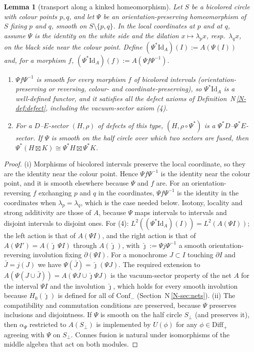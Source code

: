 \documentclass[11pt]{article}
\newtheorem{lemma}[theorem]{Lemma}
\theoremstyle{definition}
\theoremstyle{remark}
\newcommand{\fus}{\boxtimes}
\newcommand{\Id}{\mathrm{Id}}
\newcommand{\nref}[1]{N\,\ref{N-#1}}
\begin{document}
\begin{lemma}[transport along a kinked homeomorphism]\label{lem:transport}
Let $S$ be a bicolored circle with colour points $p,q$, and let $\Psi$ be an orientation-preserving homeomorphism of $S$ fixing $p$ and $q$, smooth on $S\setminus\{p,q\}$. In the local coordinates at $p$ and at $q$, assume $\Psi$ is the identity on the white side and the dilation $x\mapsto\lambda_px$, resp.\ $\lambda_qx$, on the black side near the colour point. Define $(\Psi^*\Id_A)(I):=A(\Psi(I))$ and, for a morphism $f$, $(\Psi^*\Id_A)(f):=A(\Psi f\Psi^{-1})$.
\begin{enumerate}[nosep,label=(\roman*)]
\item $\Psi f\Psi^{-1}$ is smooth for every morphism $f$ of bicolored intervals (orientation-preserving or reversing, colour- and coordinate-preserving), so $\Psi^*\Id_A$ is a well-defined functor, and it satisfies all the defect axioms of Definition~\nref{def:defect}, including the vacuum-sector axiom (4).
\item For a $D$--$E$-sector $(H,\rho)$ of defects of this type, $(H,\rho\circ\Psi^*)$ is a $\Psi^*D$--$\Psi^*E$-sector. If $\Psi$ is smooth on the half circle over which two sectors are fused, then $\Psi^*(H\fus K)\cong\Psi^*H\fus\Psi^*K$.
\end{enumerate}
\end{lemma}
\begin{proof}
(i) Morphisms of bicolored intervals preserve the local coordinate, so they are the identity near the colour point. Hence $\Psi f\Psi^{-1}$ is the identity near the colour point, and it is smooth elsewhere because $\Psi$ and $f$ are. For an orientation-reversing $f$ exchanging $p$ and $q$ in the coordinates, $\Psi f\Psi^{-1}$ is the identity in the coordinates when $\lambda_p=\lambda_q$, which is the case needed below. Isotony, locality and strong additivity are those of $A$, because $\Psi$ maps intervals to intervals and disjoint intervals to disjoint ones. For (4): $L^2((\Psi^*\Id_A)(I))=L^2(A(\Psi I))$; the left action is that of $A(\Psi I)$, and the right action is that of $A(\Psi I')=A(\hat\jmath\,\Psi I)$ through $A(\hat\jmath)$, with $\hat\jmath:=\Psi j\Psi^{-1}$ a smooth orientation-reversing involution fixing $\partial(\Psi I)$. For a monochrome $J\subset I$ touching $\partial I$ and $\bar J=j(J)$ we have $\Psi(\bar J)=\hat\jmath(\Psi J)$. The required extension to $A(\Psi(J\cup\bar J))=A(\Psi J\cup\hat\jmath\Psi J)$ is the vacuum-sector property of the net $A$ for the interval $\Psi I$ and the involution $\hat\jmath$, which holds for every smooth involution because $H_0(\hat\jmath)$ is defined for all of $\mathrm{Conf}_-$ (Section~\nref{sec:nets}).
(ii) The compatibility and commutation conditions are preserved, because $\Psi$ preserves inclusions and disjointness. If $\Psi$ is smooth on the half circle $S_\perp$ (and preserves it), then $\alpha_\Psi$ restricted to $A(S_\perp)$ is implemented by $U(\phi)$ for any $\phi\in\mathrm{Diff}_+$ agreeing with $\Psi$ on $S_\perp$. Connes fusion is natural under isomorphisms of the middle algebra that act on both modules.
\end{proof}
\end{document}
